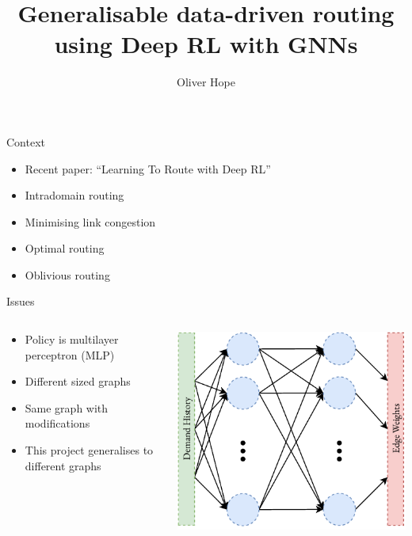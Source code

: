 \documentclass{beamer}
\title{Generalisable data-driven routing using Deep RL with GNNs}
\author{Oliver Hope}
\institute{Jesus College}\date{}
\begin{document}
\maketitle

\begin{frame}{Context}
  \begin{itemize}
    \item Recent paper: ``Learning To Route with Deep RL''\cite{valadarsky2017learning}
    \item Intradomain routing
    \item Minimising link congestion
    \item Optimal routing
    \item Oblivious routing\cite{racke2002minimizing}
  \end{itemize}
\end{frame}

\begin{frame}{Issues}
\begin{columns}
  \begin{column}{0.5\textwidth}
  \begin{itemize}
    \item Policy is multilayer perceptron (MLP)
    \item Different sized graphs
    \item Same graph with modifications
    \item This project generalises to different graphs
  \end{itemize}
  \end{column}
  \begin{column}{0.5\textwidth}
    \includegraphics[width=\textwidth]{figures/mlp.pdf}
  \end{column}
\end{columns}
\end{frame}
\end{document}
